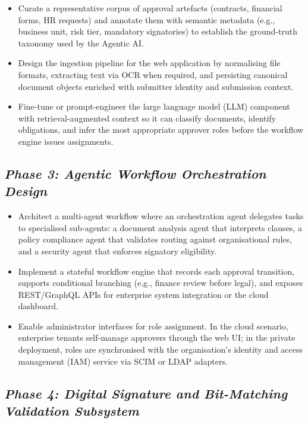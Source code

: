 \documentclass[12pt,oneside,openright,a4paper]{cpe-english-project}
\begin{document}
\begin{itemize}
\item Curate a representative corpus of approval artefacts (contracts,
financial forms, HR requests) and annotate them with semantic metadata
(e.g., business unit, risk tier, mandatory signatories) to establish the
ground-truth taxonomy used by the Agentic AI.
\item Design the ingestion pipeline for the web application by
normalising file formats, extracting text via OCR when required, and
persisting canonical document objects enriched with submitter identity
and submission context.
\item Fine-tune or prompt-engineer the large language model (LLM)
component with retrieval-augmented context so it can classify documents,
identify obligations, and infer the most appropriate approver roles
before the workflow engine issues assignments.
\end{itemize}

\subsection{\texorpdfstring{\emph{Phase 3: Agentic Workflow Orchestration Design}}{Phase 3: Agentic Workflow Orchestration Design}}

\begin{itemize}
\item Architect a multi-agent workflow where an orchestration agent
delegates tasks to specialised sub-agents: a document analysis agent that
interprets clauses, a policy compliance agent that validates routing
against organisational rules, and a security agent that enforces
signatory eligibility.
\item Implement a stateful workflow engine that records each approval
transition, supports conditional branching (e.g., finance review before
legal), and exposes REST/GraphQL APIs for enterprise system integration
or the cloud dashboard.
\item Enable administrator interfaces for role assignment. In the
cloud scenario, enterprise tenants self-manage approvers through the web
UI; in the private deployment, roles are synchronised with the
organisation's identity and access management (IAM) service via SCIM or
LDAP adapters.
\end{itemize}

\subsection{\texorpdfstring{\emph{Phase 4: Digital Signature and Bit-Matching Validation Subsystem}}{Phase 4: Digital Signature and Bit-Matching Validation Subsystem}}
\end{document}

